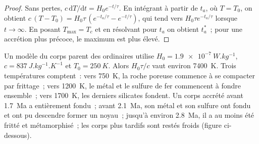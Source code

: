 \begin{proof}
Sans pertes, $c\,\mathrm dT/\mathrm dt = H_0 e^{-t/\tau}$. En intégrant à partir de $t_a$,
où $T = T_0$, on obtient $c\,(T - T_0) = H_0\tau\,(e^{-t_a/\tau} - e^{-t/\tau})$, qui tend
vers $H_0\tau e^{-t_a/\tau}$ lorsque $t \to \infty$. En posant $T_{\max} = T_c$ et en
résolvant pour $t_a$ on obtient $t_a^*$~; pour une accrétion plus précoce, le maximum est
plus élevé.
\end{proof}

Un modèle du corps parent des  ordinaires utilise
$H_0 = \qty{1.9e-7}{W.kg^{-1}}$, $c = \qty{837}{J.kg^{-1}.K^{-1}}$ et
$T_0 = \qty{250}{K}$. Alors $H_0\tau/c$ vaut environ \qty{7400}{K}. Trois températures
comptent~: vers \qty{750}{K}, la roche poreuse commence à se compacter par frittage~;
vers \qty{1200}{K}, le métal et le sulfure de fer commencent à fondre ensemble~; vers
\qty{1700}{K}, les derniers silicates fondent. Un corps accrété avant \qty{1.7}{Ma} a
entièrement fondu~; avant \qty{2.1}{Ma}, son métal et son sulfure ont fondu et ont pu
descendre former un noyau~; jusqu'à environ \qty{2.8}{Ma}, il a au moins été fritté et
métamorphisé~; les corps plus tardifs sont restés froids (figure ci-dessous).

